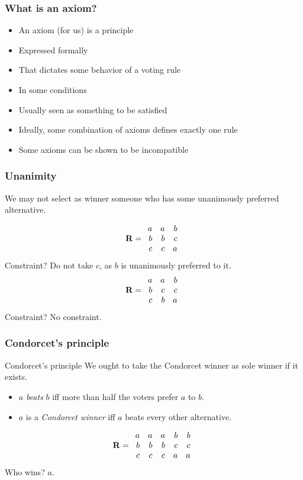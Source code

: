\documentclass[french,english]{beamer}
\begin{document}
\begin{frame}
	\frametitle{What is an axiom?}
	\begin{itemize}
		\item An axiom (for us) is a principle
		\item Expressed formally
		\item That dictates some behavior of a voting rule
		\item In some conditions
		\item Usually seen as something to be satisfied
		\item Ideally, some combination of axioms defines exactly one rule
		\item Some axioms can be shown to be incompatible
	\end{itemize}
\end{frame}

\begin{frame}
	\frametitle{Unanimity}
	\begin{definition}[Unanimity]
		We may not select as winner someone who has some unanimously preferred alternative.
	\end{definition}
	\begin{equation}
		\mathbf{R} =
		\begin{array}{rrr}
			a	&	a	&	b\\
			b	&	b	&	c\\
			c	&	c	&	a
		\end{array}
	\end{equation}
	Constraint? \pause Do not take $c$, as $b$ is unanimously preferred to it.	\pause
	\begin{equation}
		\mathbf{R} =
		\begin{array}{rrr}
			a	&	a	&	b\\
			b	&	c	&	c\\
			c	&	b	&	a
		\end{array}
	\end{equation}
	Constraint? \pause No constraint.
\end{frame}

\begin{frame}
	\frametitle{Condorcet’s principle}
	\begin{block}{Condorcet’s principle}
		We ought to take the Condorcet winner as sole winner if it exists.
		\begin{itemize}
			\item $a$ \emph{beats} $b$ iff more than half the voters prefer $a$ to $b$.
			\item $a$ is a \emph{Condorcet winner} iff $a$ beats every other alternative.
		\end{itemize}
	\end{block}
	\vfill
	\begin{equation}
		\mathbf{R} =
		\begin{array}{rrrrr}
			a	&	a	&	a	&	b	&	b\\
			b	&	b	&	b	&	c	&	c\\
			c	&	c	&	c	&	a	&	a
		\end{array}
	\end{equation}
	 Who wins? \pause $a$.
\end{frame}
\end{document}
